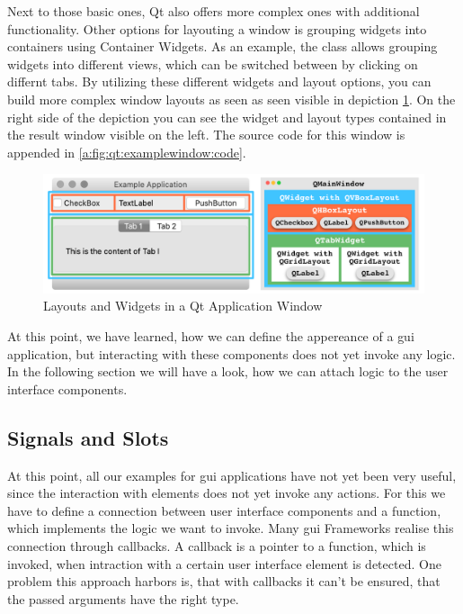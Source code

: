Next to those basic ones, Qt also offers more complex ones with additional
functionality. Other options for layouting a window is grouping widgets into
containers using Container Widgets. As an example, the class
 allows grouping widgets into different
views, which can be switched between by clicking on differnt tabs. By utilizing
these different widgets and layout options, you can build more complex window
layouts as seen as seen visible in depiction \ref{fig:qt:examplewindow}. On the
right side of the depiction you can see the widget and layout types contained in
the result window visible on the left. The source code for this window is
appended in \ref{a:fig:qt:examplewindow:code}.  \cite{PythonGui1}

\begin{figure}[h]
    \centering
    \includegraphics[width=15cm]{resources/img/QtExample}
    \caption{Layouts and Widgets in a Qt Application Window}
    \label{fig:qt:examplewindow}
\end{figure}

At this point, we have learned, how we can define the appereance of a \gls{gui}
application, but interacting with these components does not yet invoke any
logic. In the following section we will have a look, how we can attach logic to
the user interface components.



\subsection{Signals and Slots}
\label{sec:fundamentals:qt:signalsslots}

At this point, all our examples for \gls{gui} applications have not yet been
very useful, since the interaction with elements does not yet invoke any
actions. For this we have to define a connection between user interface
components and a function, which implements the logic we want to invoke. Many
\gls{gui} Frameworks realise this connection through callbacks. A callback is a
pointer to a function, which is invoked, when intraction with a certain user
interface element is detected. One problem this approach harbors is, that with
callbacks it can't be ensured, that the passed arguments have the right type.

